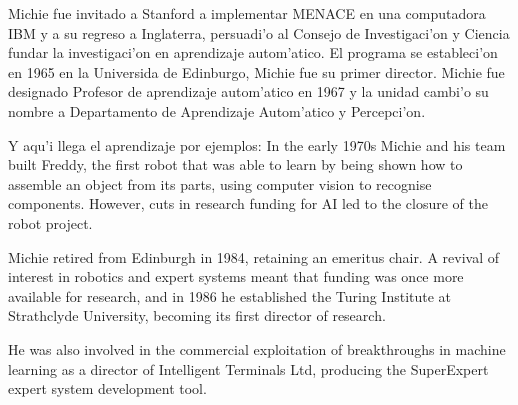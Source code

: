 \documentclass[11pt]{article}
\begin{document}
Michie fue invitado a Stanford a implementar MENACE en una computadora IBM y a su regreso a Inglaterra, persuadi'o al Consejo de Investigaci'on y Ciencia fundar la investigaci'on en aprendizaje autom'atico. El programa se estableci'on en 1965 en la Universida de Edinburgo, Michie fue su primer director. Michie fue designado Profesor de aprendizaje autom'atico en 1967 y la unidad cambi'o su nombre a Departamento de Aprendizaje Autom'atico y Percepci'on.





Y aqu'i llega el aprendizaje por ejemplos:
In the early 1970s Michie and his team built Freddy, the first robot that was able to learn by being shown how to assemble an object from its parts, using computer vision to recognise components. However, cuts in research funding for AI led to the closure of the robot project.

Michie retired from Edinburgh in 1984, retaining an emeritus chair. A revival of interest in robotics and expert systems meant that funding was once more available for research, and in 1986 he established the Turing Institute at Strathclyde University, becoming its first director of research.

He was also involved in the commercial exploitation of breakthroughs in machine learning as a director of Intelligent Terminals Ltd, producing the SuperExpert expert system development tool. 
\end{document}
